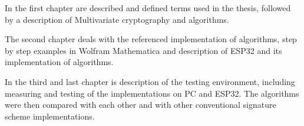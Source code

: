 \documentclass[thesis=M,english]{FITthesis}[2019/12/23]
\begin{document}
\bigskip
\noindent
In the first chapter are described and defined terms used in the thesis, followed by a description of Multivariate cryptography and algorithms.

\bigskip
\noindent
The second chapter deals with the referenced implementation of algorithms, step by step examples in Wolfram Mathematica and description of ESP32 and its implementation of algorithms.

\bigskip
\noindent
In the third and last chapter is description of the testing environment, including measuring and testing of the implementations on PC and ESP32. The algorithms were then compared with each other and with other conventional signature scheme implementations.



\end{document}

